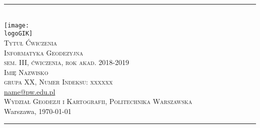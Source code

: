 \documentclass[10pt,a4paper]{article}
\makeatletter
\newcommand{\logoGIK}{settings/WGiK-znak.png}
\newcommand{\authorName}{Imię Nazwisko  \\ grupa XX, Numer Indeksu: xxxxxx}
\newcommand{\titeReport}{Tytuł Ćwiczenia} %
\newcommand{\titleLecture}{Informatyka Geodezyjna \\ sem. III, ćwiczenia, rok akad. 2018-2019} %
\newcommand{\mymail}{\href{mailto:name@pw.edu.pl}{name@pw.edu.pl}}
\newcommand{\faculty}{Wydział Geodezji i Kartografii}
\newcommand{\university}{Politechnika Warszawska}
\newcommand{\city}{Warszawa}
\makeatother
\begin{document}
\begin{center} 
\rule{\textwidth}{.5pt} \\
\vspace{1.0cm}
    \texttt{[image: \\logoGIK]}
\vspace{0.5cm} \\
	\Large \textsc{\titeReport}
\vspace{0.5cm} \\  
	\large \textsc{\titleLecture}
\vspace{0.5cm}\\
	\textsc{\authorName}  \\
	\mymail \\
	\textsc{\faculty}, \textsc{\university}  \\ 
	 \city, \today
\end{center} 
\rule{\textwidth}{1.5pt}



\tableofcontents 								%
\newpage
%











\end{document}
